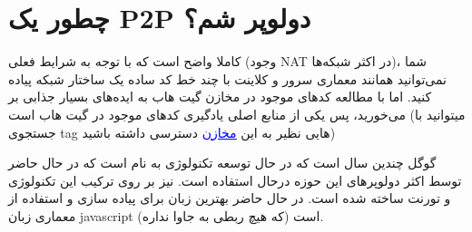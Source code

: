 \documentclass[]{article}
\begin{document}
\section*{{\titr  چطور یک P2P دولوپر شم؟}}

کاملا واضح است که با توجه به شرایط فعلی (وجود NAT در اکثر شبکه‌ها)، شما نمی‌توانید همانند معماری سرور و کلاینت با چند خط کد ساده یک ساختار شبکه  پیاده کنید. اما با مطالعه کد‌های موجود در مخازن گیت هاب به ایده‌های بسیار جذابی بر می‌خورید، پس یکی از منابع اصلی یادگیری  کدهای موجود در گیت هاب است (میتوانید با جستجوی tag هایی نظیر  به این \href{https://github.com/search?l=Java&q=p2p-network&type=Repositories}{\textcolor{blue}{\underline{مخازن}}}
 دسترسی داشته باشید) 


گوگل چندین سال است که در حال توسعه تکنولوژی به نام \href{https://webrtc.org/}{\textcolor{blue}{\underline{}}} است که در حال حاضر توسط اکثر دولوپر‌های این حوزه درحال استفاده است. \href{https://webtorrent.io/}{\textcolor{blue}{\underline{}}} نیز بر روی ترکیب این تکنولوژی و تورنت ساخته شده است. در حال حاضر بهترین زبان برای پیاده سازی و استفاده از معماری  زبان javascript (که هیچ ربطی به جاوا نداره) است.
\end{document}
